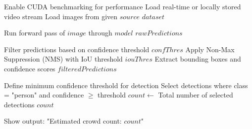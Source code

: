 \documentclass[11pt]{report}
\begin{document}
\begin{algorithm}[H]
\caption{Load Input Source}
\begin{algorithmic}[1]
        \State Enable CUDA benchmarking for performance
        \State Load real-time or locally stored video stream
    \Else
        \State Load images from given $source$
    \EndIf
    \State \Return $dataset$
\EndFunction
\end{algorithmic}
\end{algorithm}

\begin{algorithm}[H]
\caption{Perform Inference}
\begin{algorithmic}[1]
    \State Run forward pass of $image$ through $model$
    \State \Return $rawPredictions$
\EndFunction
\end{algorithmic}
\end{algorithm}

\begin{algorithm}[H]
\caption{Apply Non-Max Suppression}
\begin{algorithmic}[1]
    \State Filter predictions based on confidence threshold $confThres$
    \State Apply Non-Max Suppression (NMS) with IoU threshold $iouThres$
    \State Extract bounding boxes and confidence scores
    \State \Return $filteredPredictions$
\EndFunction
\end{algorithmic}
\end{algorithm}

\begin{algorithm}[H]
\caption{Count People}
\begin{algorithmic}[1]
    \State Define minimum confidence threshold for detection
    \State Select detections where class = "person" and confidence $\geq$ threshold
    \State $count \gets$ Total number of selected detections
    \State \Return $count$
\EndFunction
\end{algorithmic}
\end{algorithm}

\begin{algorithm}[H]
\caption{Display Crowd Count}
\begin{algorithmic}[1]
    \State Show output: "Estimated crowd count: $count$"
\EndFunction
\end{algorithmic}
\end{algorithm}
\end{document}
